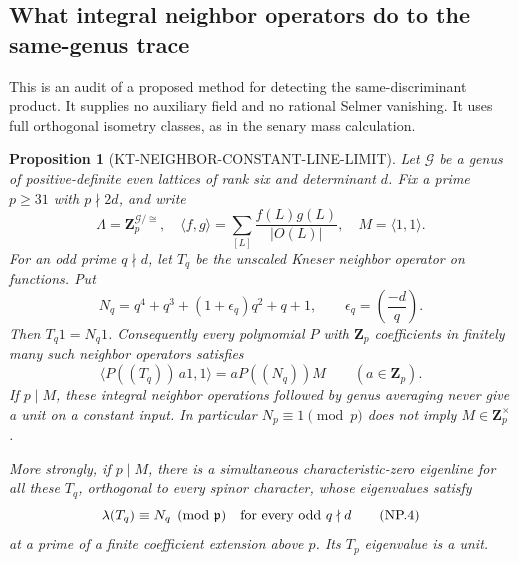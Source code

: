 \documentclass[11pt,a4paper]{article}
\newtheorem{proposition}[theorem]{Proposition}
\theoremstyle{definition}
\begin{document}


\subsection{What integral neighbor operators do to the same-genus trace}

This is an audit of a proposed method for detecting the same-discriminant
product.  It supplies no auxiliary field and no rational Selmer vanishing.
It uses full orthogonal isometry classes, as in the senary mass calculation.

\begin{proposition}[KT-NEIGHBOR-CONSTANT-LINE-LIMIT]
Let $\mathcal G$ be a genus of positive-definite even lattices of rank six
and determinant $d$.  Fix a prime $p\geq31$ with $p\nmid2d$, and write
\[
 \Lambda=\mathbf Z_p^{\mathcal G/\cong},\quad
 \langle f,g\rangle=\sum_{[L]}\frac{f(L)g(L)}{|O(L)|},\quad
 M=\langle1,1\rangle.
 \tag{NP.1}
\]
For an odd prime $q\nmid d$, let $T_q$ be the unscaled Kneser neighbor
operator on functions.  Put
\[
 N_q=q^4+q^3+(1+\epsilon_q)q^2+q+1,
 \qquad \epsilon_q=\left(\frac{-d}{q}\right).
 \tag{NP.2}
\]
Then $T_q1=N_q1$.  Consequently every polynomial $P$ with
$\mathbf Z_p$ coefficients in finitely many such neighbor operators satisfies
\[
 \langle P((T_q))\,a1,1\rangle
       =aP((N_q))M\qquad(a\in\mathbf Z_p).
 \tag{NP.3}
\]
If $p\mid M$, these integral neighbor operations followed by genus
averaging never give a unit on a constant input.  In particular
$N_p\equiv1\pmod p$ does not imply $M\in\mathbf Z_p^\times$.

More strongly, if $p\mid M$, there is a simultaneous
characteristic-zero eigenline for all these $T_q$, orthogonal to
every spinor character, whose eigenvalues satisfy
\[
                  \lambda(T_q)\equiv N_q\pmod{\mathfrak p}
                         \quad\hbox{for every odd }q\nmid d
 \tag{NP.4}
\]
at a prime of a finite coefficient extension above $p$.
Its $T_p$ eigenvalue is a unit.
\end{proposition}
\end{document}

